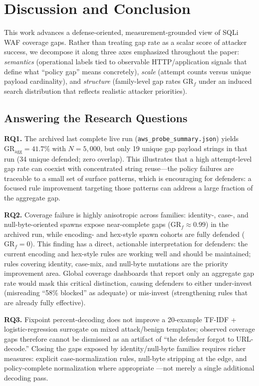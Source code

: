 \section{Discussion and Conclusion}
\label{sec:discussion}
This work advances a defense-oriented, measurement-grounded view of SQLi WAF coverage gaps. Rather than treating gap rate as a scalar score of attacker success, we decompose it along three axes emphasized throughout the paper: \emph{semantics} (operational labels tied to observable HTTP/application signals that define what ``policy gap'' means concretely), \emph{scale} (attempt counts versus unique payload cardinality), and \emph{structure} (family-level gap rates $\mathrm{GR}_f$ under an induced search distribution that reflects realistic attacker priorities).

\subsection{Answering the Research Questions}
\textbf{RQ1.} The archived last complete live run (\texttt{aws\_probe\_summary.json}) yields $\mathrm{GR}_{\mathrm{agg}}=41.7\%$ with $N=5{,}000$, but only 19 unique gap payload strings in that run (34 unique defended; zero overlap). This illustrates that a high attempt-level gap rate can coexist with concentrated string reuse---the policy failures are traceable to a small set of surface patterns, which is encouraging for defenders: a focused rule improvement targeting those patterns can address a large fraction of the aggregate gap.

\textbf{RQ2.} Coverage failure is highly anisotropic across families: identity-, case-, and null-byte-oriented spawns expose near-complete gaps ($\mathrm{GR}_f\approx 0.99$) in the archived run, while encoding- and hex-style spawn cohorts are fully defended ($\mathrm{GR}_f=0$). This finding has a direct, actionable interpretation for defenders: the current encoding and hex-style rules are working well and should be maintained; rules covering identity, case-mix, and null-byte mutations are the priority improvement area. Global coverage dashboards that report only an aggregate gap rate would mask this critical distinction, causing defenders to either under-invest (misreading ``58\% blocked'' as adequate) or mis-invest (strengthening rules that are already fully effective).

\textbf{RQ3.} Fixpoint percent-decoding does not improve a 20-example TF-IDF + logistic-regression surrogate on mixed attack/benign templates; observed coverage gaps therefore cannot be dismissed as an artifact of ``the defender forgot to URL-decode.'' Closing the gaps exposed by identity/null-byte families requires richer measures: explicit case-normalization rules, null-byte stripping at the edge, and policy-complete normalization where appropriate \cite{httpnormalizer,rfc7230}---not merely a single additional decoding pass.

